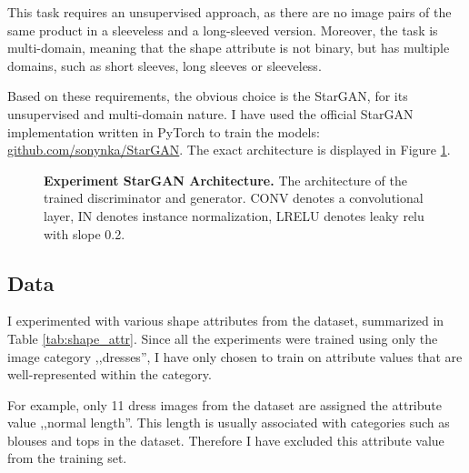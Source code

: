\documentclass[12pt]{report}
\begin{document}
This task requires an unsupervised approach, as there are no image pairs of the same product in a sleeveless and a long-sleeved version. Moreover, the task is multi-domain, meaning that the shape attribute is not binary, but has multiple domains, such as short sleeves, long sleeves or sleeveless. 

Based on these requirements, the obvious choice is the StarGAN, for its unsupervised and multi-domain nature. I have used the official StarGAN implementation written in PyTorch to train the models: \hyperlink{https://github.com/sonynka/StarGAN}{github.com/sonynka/StarGAN}. The exact architecture is displayed in Figure \ref{fig:stargan_arch}.

\vspace{0.5cm}
\begin{figure}[h]
\centering
{}\vspace{.5cm}
\caption{\label{fig:stargan_arch} \textbf{Experiment StarGAN Architecture.} The architecture of the trained  discriminator and generator. CONV denotes a convolutional layer, IN denotes instance normalization, LRELU denotes leaky relu with slope 0.2.}
\end{figure}


\subsection{Data}
I experimented with various shape attributes from the dataset, summarized in Table \ref{tab:shape_attr}. Since all the experiments were trained using only the image category ,,dresses'', I have only chosen to train on attribute values that are well-represented within the category. 

For example, only 11 dress images from the dataset are assigned the attribute value ,,normal length''. This length is usually associated with categories such as blouses and tops in the dataset. Therefore I have excluded this attribute value from the training set.
\end{document}
